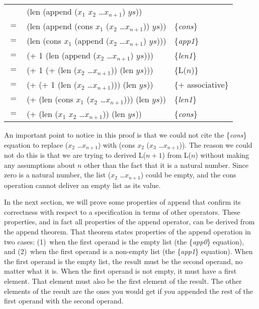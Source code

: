 \begin{center}
\begin{tabular}{lll}
    & (len (append ($x_1$ $x_2$ \dots $x_{n+1}$) $ys$))         &                     \\
$=$ & (len (append (cons $x_1$ ($x_2$ \dots $x_{n+1}$)) $ys$))  & \{\emph{cons}\}     \\
$=$ & (len (cons $x_1$ (append ($x_2$ \dots $x_{n+1}$) $ys$)))  & \{\emph{app1}\}     \\
$=$ & (+ 1 (len (append ($x_2$ \dots $x_{n+1}$) $ys$)))         & \{\emph{len1}\}     \\
$=$ & (+ 1 (+ (len ($x_2$ \dots $x_{n+1}$)) (len $ys$)))        & \{L($n$)\}          \\
$=$ & (+ (+ 1 (len ($x_2$ \dots $x_{n+1}$))) (len $ys$))        & \{$+$ associative\} \\
$=$ & (+ (len (cons $x_1$ ($x_2$ \dots $x_{n+1}$))) (len $ys$)) & \{\emph{len1}\}     \\
$=$ & (+ (len ($x_1$ $x_2$ \dots $x_{n+1}$)) (len $ys$))        & \{\emph{cons}\}     \\
\end{tabular}
\end{center}

An important point to notice in this proof is that we could not cite the \{\emph{cons}\} equation to replace ($x_2$ \dots $x_{n+1}$) with (cons $x_2$ ($x_3$ \dots $x_{n+1}$)). The reason we could not do this is that we are trying to derived L($n+1$) from L($n$) without making any assumptions about $n$ other than the fact that it is a natural number. Since zero is a natural number, the list ($x_2$ \dots $x_{n+1}$) could be empty, and the cons operation cannot deliver an empty list as its value.

In the next section, we will prove some properties of append that confirm its correctness with respect to a specification in terms of other operators. These properties, and in fact all properties of the append operator, can be derived from the append theorem. That theorem states properties of the append operation in two cases: (1)~when the first operand is the empty list (the \{\emph{app0}\} equation), and (2)~when the first operand is a non-empty list (the \{\emph{app1}\} equation). When the first operand is the empty list, the result must be the second operand, no matter what it is. When the first operand is not empty, it must have a first element. That element must also be the first element of the result. The other elements of the result are the ones you would get if you appended the rest of the first operand with the second operand.

